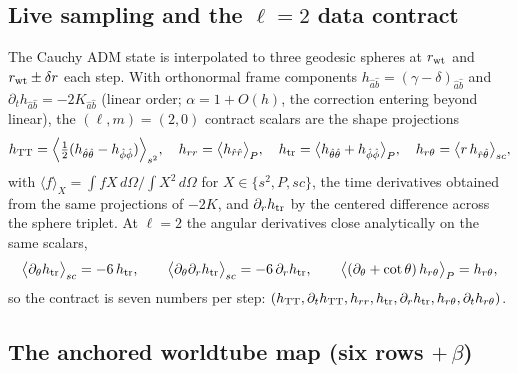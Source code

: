 \subsection{Live sampling and the $\ell=2$ data contract}
\label{sec:contract}

\begin{nfblock}
The Cauchy ADM state is interpolated to three geodesic spheres at
$r_{\rm wt}$ and $r_{\rm wt}\pm\delta r$ each step. With orthonormal
frame components $h_{\hat a\hat b} = (\gamma - \delta)_{\hat a\hat b}$
and $\partial_t h_{\hat a\hat b} = -2K_{\hat a\hat b}$ (linear order;
$\alpha = 1 + O(h)$, the correction entering beyond linear), the
$(\ell,m)=(2,0)$ contract scalars are the shape projections
\begin{equation}
h_{\rm TT} = \Big\langle \tfrac12(h_{\hat\theta\hat\theta}
 - h_{\hat\phi\hat\phi})\Big\rangle_{s^2},
\quad
h_{rr} = \big\langle h_{\hat r\hat r}\big\rangle_{P},
\quad
h_{\rm tr} = \big\langle h_{\hat\theta\hat\theta}
 + h_{\hat\phi\hat\phi}\big\rangle_{P},
\quad
h_{r\theta} = \big\langle r\,h_{\hat r\hat\theta}\big\rangle_{sc},
\label{eq:contract}
\end{equation}
with $\langle f\rangle_X = \int f X\,d\Omega / \int X^2\,d\Omega$ for
$X \in \{s^2, P, sc\}$, the time derivatives obtained from the same
projections of $-2K$, and $\partial_rh_{\rm tr}$ by the centered difference
across the sphere triplet. At $\ell=2$ the angular derivatives close
analytically on the same scalars,
\begin{equation}
\big\langle\partial_\theta h_{\rm tr}\big\rangle_{sc} = -6\,h_{\rm tr},
\qquad
\big\langle\partial_\theta \partial_rh_{\rm tr}\big\rangle_{sc}
 = -6\,\partial_rh_{\rm tr},
\qquad
\big\langle(\partial_\theta + \cot\theta)\,h_{r\theta}\big\rangle_{P}
 = h_{r\theta},
\label{eq:dthclosures}
\end{equation}
so the contract is seven numbers per step:
$(h_{\rm TT}, \partial_t h_{\rm TT}, h_{rr}, h_{\rm tr}, \partial_rh_{\rm tr},
 h_{r\theta}, \partial_t h_{r\theta})$.
\end{nfblock}

\subsection{The anchored worldtube map (six rows $+\,\beta$)}
\label{sec:wtmap}

